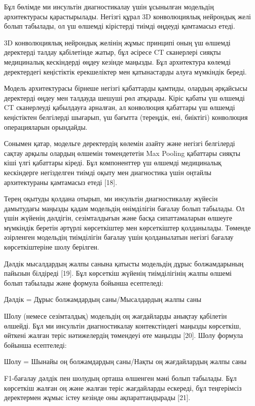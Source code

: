 \begin{multicols}{2}
Бұл бөлімде ми инсультін диагностикалау үшін ұсынылған модельдің
архитектурасы қарастырылады. Негізгі құрал 3D конволюциялық нейрондық
желі болып табылады, ол үш өлшемді кірістерді тиімді өңдеуді қамтамасыз
етеді.

3D конволюциялық нейрондық желінің жұмыс принципі оның үш өлшемді
деректерді талдау қабілетінде жатыр, бұл әсіресе CT сканерлері сияқты
медициналық кескіндерді өңдеу кезінде маңызды. Бұл архитектура көлемді
деректердегі кеңістіктік ерекшеліктер мен қатынастарды алуға мүмкіндік
береді.

Модель архитектурасы бірнеше негізгі қабаттарды қамтиды, олардың
әрқайсысы деректерді өңдеу мен талдауда шешуші рөл атқарады. Кіріс
қабаты үш өлшемді CT сканерлеуді қабылдауға арналған, ал конволюция
қабаттары үш өлшемді кеңістіктен белгілерді шығарып, үш бағытта
(тереңдік, ені, биіктігі) конволюция операцияларын орындайды.

Сонымен қатар, модельге деректердің көлемін азайту және негізгі
белгілерді сақтау арқылы олардың өлшемін төмендететін Max Pooling
қабаттары сияқты кіші үлгі қабаттары кіреді. Бұл компоненттер үш өлшемді
медициналық кескіндерге негізделген тиімді оқыту мен диагностика үшін
оңтайлы архитектураны қамтамасыз етеді {[}18{]}.

Терең оқытуды қолдана отырып, ми инсультін диагностикалау жүйесін
дамытудағы маңызды қадам модельдің өнімділігін бағалау болып табылады.
Ол үшін жүйенің дәлдігін, сезімталдығын және басқа сипаттамаларын
өлшеуге мүмкіндік беретін әртүрлі көрсеткіштер мен көрсеткіштер
қолданылады. Төменде әзірленген модельдің тиімділігін бағалау үшін
қолданылатын негізгі бағалау көрсеткіштеріне шолу берілген.

Дәлдік мысалдардың жалпы санына қатысты модельдің дұрыс болжамдарының
пайызын білдіреді {[}19{]}. Бұл көрсеткіш жүйенің тиімділігінің жалпы
өлшемі болып табылады және формула бойынша есептеледі:

Дәлдік = Дұрыс болжамдардың саны/Мысалдардың жалпы саны

Шолу (немесе сезімталдық) модельдің оң жағдайларды анықтау қабілетін
өлшейді. Бұл ми инсультін диагностикалау контекстіндегі маңызды
көрсеткіш, өйткені жалған теріс нәтижелердің төмендеуі өте маңызды
{[}20{]}. Шолу формула бойынша есептеледі:

Шолу = Шынайы оң болжамдардың саны/Нақты оң жағдайлардың жалпы саны

F1-бағалау дәлдік пен шолудың орташа өлшенген мәні болып табылады. Бұл
көрсеткіш жалған оң және жалған теріс жағдайларды ескереді, бұл
теңгерімсіз деректермен жұмыс істеу кезінде оны ақпараттандырады
{[}21{]}.


\end{multicols}
